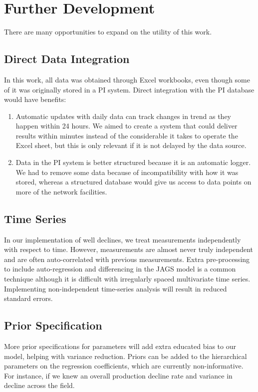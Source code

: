 \documentclass[a4paper, 12pt]{article}
\begin{document}

\section{Further Development}
There are many opportunities to expand on the utility of this work.

\subsection{Direct Data Integration}
In this work, all data was obtained through Excel workbooks, even though some of it was originally stored in a PI system. Direct integration with the PI database would have benefits:

\begin{enumerate}
\item Automatic updates with daily data can track changes in trend as they happen within 24 hours.  We aimed to create a system that could deliver results within minutes instead of the considerable it takes to operate the Excel sheet, but this is only relevant if it is not delayed by the data source.
\item Data in the PI system is better structured because it is an automatic logger. We had to remove some data because of incompatibility with how it was stored, whereas a structured database would give us access to data points on more of the network facilities.
\end{enumerate}

\subsection{Time Series}
In our implementation of well declines, we treat measurements independently with respect to time. However, measurements are almost never truly independent and are often auto-correlated with previous measurements. Extra pre-processing to include auto-regression and differencing in the JAGS model is a common technique although it is difficult with irregularly spaced multivariate time series. Implementing non-independent time-series analysis will result in reduced standard errors.

\subsection{Prior Specification}
More prior specifications for parameters will add extra educated bias to our model, helping with variance reduction. Priors can be added to the hierarchical parameters on the regression coefficients, which are currently non-informative. For instance, if we knew an overall production decline rate and variance in decline across the field.
\end{document}
